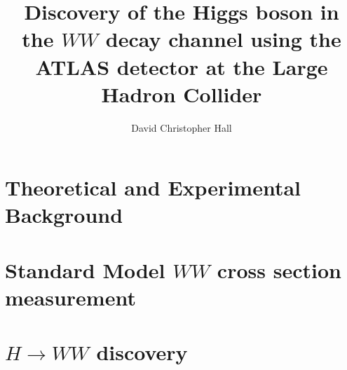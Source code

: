 \documentclass[sftitles]{hepthesis}
\title{Discovery of the Higgs boson in the $WW$ decay channel using the ATLAS detector at the Large Hadron Collider}
\author{David Christopher Hall}
\begin{document}
\begin{frontmatter}
  
\end{frontmatter}

\begin{mainmatter}
  
  \part{Theoretical and Experimental Background}
  
  
  

  \part{Standard Model $WW$ cross section measurement}

  \part{$H\rightarrow WW$ discovery}

\end{mainmatter}

\begin{appendices}

\end{appendices}

\begin{backmatter}
  
  
  \listoffigures
  \listoftables
\end{backmatter}
\end{document}
